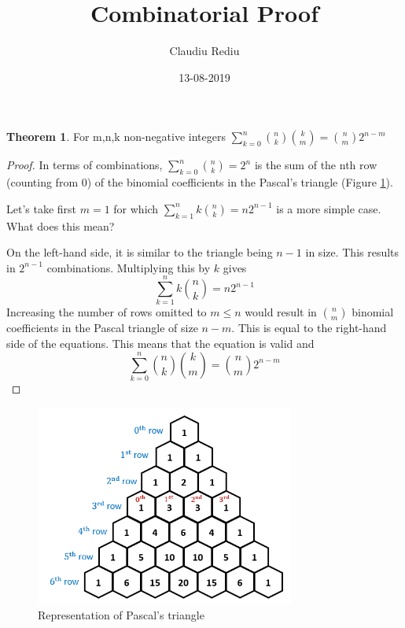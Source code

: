 \documentclass[11pt, a4paper]{article}
\title{{\myfont Combinatorial Proof}}
\date{13-08-2019}
\author{Claudiu Rediu}
\theoremstyle{definition}
\theoremstyle{theorem}
\newtheorem*{theorem}{Theorem}
\begin{document}
	\maketitle
	\newpage
	\newpage
	\begin{theorem}
		For m,n,k non-negative integers $\sum_{k=0}^{n}\binom{n}{k}\binom{k}{m} = \binom{n}{m}2^{n-m}$
	\end{theorem}

	\begin{proof}
	In terms of combinations, $\sum_{k=0}^{n}\binom{n}{k} = 2^n$ is the sum of the nth row (counting from 0) of the binomial coefficients in the Pascal's triangle (Figure \ref{fig:pascals}). 
	
	Let's take first $ m = 1 $ for which $\sum_{k=1}^{n}k\binom{n}{k} = n2^{n-1}$ is a more simple case. What does this mean?
	
	On the left-hand side, it is similar to the triangle being $n-1$ in size. This results in $2^{n-1}$ combinations. Multiplying this by $k$ gives $$\sum_{k=1}^{n}k\binom{n}{k} = n2^{n-1}$$ Increasing the number of rows omitted to $m \le n$ would result in $\binom{n}{m}$ binomial coefficients in the Pascal triangle of size $n-m$. 
	This is equal to the right-hand side of the equations. This means that the equation is valid and
	$$\sum_{k=0}^{n}\binom{n}{k}\binom{k}{m} = \binom{n}{m}2^{n-m}$$
	\end{proof}
	\begin{figure}[h]
		\includegraphics[width = \linewidth, height = 250px]{pascals.png}
		\caption{Representation of Pascal's triangle}
		\label{fig:pascals}
	\end{figure}
	
\end{document}
